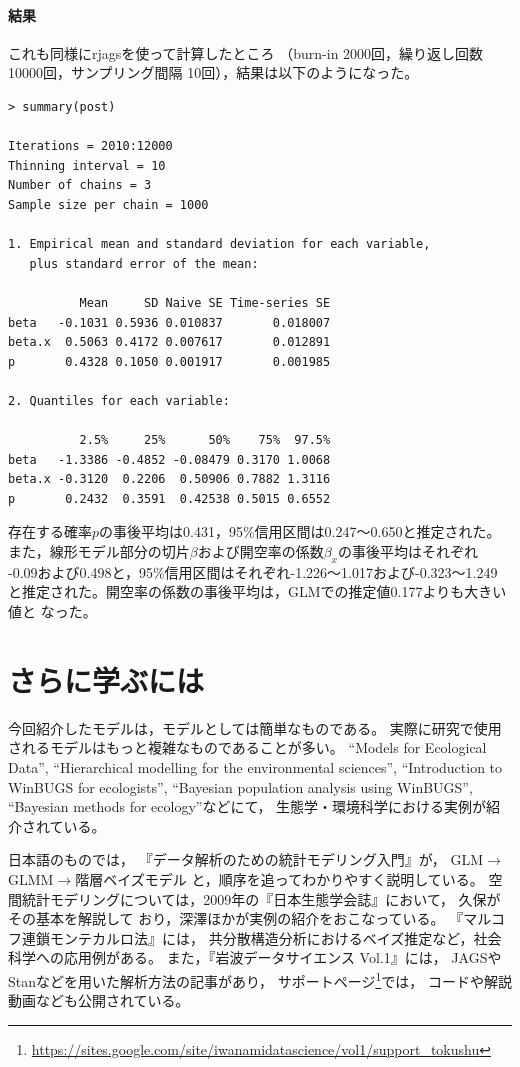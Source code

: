 \documentclass[11pt,uplatex]{jsarticle}
\begin{document}
\paragraph{結果}
これも同様に\textsf{rjags}を使って計算したところ
（burn-in 2000回，繰り返し回数 10000回，サンプリング間隔 10回），結果は以下のようになった。

\begin{lstlisting}
> summary(post)

Iterations = 2010:12000
Thinning interval = 10 
Number of chains = 3 
Sample size per chain = 1000 

1. Empirical mean and standard deviation for each variable,
   plus standard error of the mean:

          Mean     SD Naive SE Time-series SE
beta   -0.1031 0.5936 0.010837       0.018007
beta.x  0.5063 0.4172 0.007617       0.012891
p       0.4328 0.1050 0.001917       0.001985

2. Quantiles for each variable:

          2.5%     25%      50%    75%  97.5%
beta   -1.3386 -0.4852 -0.08479 0.3170 1.0068
beta.x -0.3120  0.2206  0.50906 0.7882 1.3116
p       0.2432  0.3591  0.42538 0.5015 0.6552

\end{lstlisting}
存在する確率$p$の事後平均は0.431，95\%信用区間は0.247〜0.650と推定された。
また，線形モデル部分の切片$\beta$および開空率の係数$\beta_{x}$の事後平均はそれぞれ
-0.09および0.498と，95\%信用区間はそれぞれ-1.226〜1.017および-0.323〜1.249
と推定された。開空率の係数の事後平均は，GLMでの推定値0.177よりも大きい値と
なった。


\section{さらに学ぶには}

今回紹介したモデルは，モデルとしては簡単なものである。
実際に研究で使用されるモデルはもっと複雑なものであることが多い。
``Models for Ecological Data''\cite{Clark},
``Hierarchical modelling for the environmental sciences''\cite{Clark_Gelfand},
``Introduction to WinBUGS for ecologists''\cite{IWE},
``Bayesian population analysis using WinBUGS''\cite{BPA},
``Bayesian methods for ecology''\cite{McCarthy}などにて，
生態学・環境科学における実例が紹介されている。

日本語のものでは，
『データ解析のための統計モデリング入門』\cite{Kubo:Modeling}が，
GLM$\rightarrow$GLMM$\rightarrow$階層ベイズモデル
と，順序を追ってわかりやすく説明している。
空間統計モデリングについては，2009年の『日本生態学会誌』において，
久保\cite{Kubo}がその基本を解説して
おり，深澤ほか\cite{Fukasawa_et_al}が実例の紹介をおこなっている。
『マルコフ連鎖モンテカルロ法』\cite{Toyoda}には，
共分散構造分析におけるベイズ推定など，社会科学への応用例がある。
また，『岩波データサイエンス Vol.1』\cite{Iwanami_vol1}には，
\textsf{JAGS}や\textsf{Stan}などを用いた解析方法の記事があり，
サポートページ\footnote{\url{https://sites.google.com/site/iwanamidatascience/vol1/support_tokushu}}では，
コードや解説動画なども公開されている。
\end{document}
